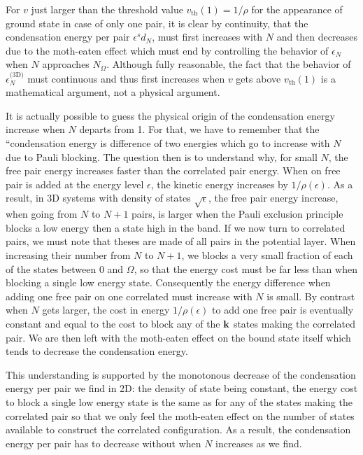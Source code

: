 \documentclass{article}
\newcommand{\sd}{{\ensuremath{{\text{(3D)}}}}}
\begin{document}
\subsubsection{}
For $v$ just larger than the threshold value $v_{\text{th}}(1)=1/\rho$ for the appearance of ground state in case of only one pair, it is clear by continuity, that the condensation energy per pair $\epsilon^sd_N$, must first increases with $N$ and then decreases due to the moth-eaten effect which must end by controlling the behavior of $\epsilon_N$ when $N$ approaches $N_\Omega$.  Although fully reasonable, the fact that the behavior of $\epsilon^\sd_N$ must continuous and thus first increases when $v$ gets above $v_{\text{th}}(1)$ is a mathematical argument, not a physical argument. 

It is actually possible to guess the physical origin of the condensation energy increase when $N$ departs from 1.  For that, we have to remember that the ``condensation energy is difference of two energies which go to increase with $N$ due to Pauli blocking.  The question then is to understand why, for small $N$, the free pair energy increases faster than the correlated pair energy.  When on free pair is added at the energy level $\epsilon$, the kinetic energy increases by $1/\rho(\epsilon)$.  As a result, in 3D systems with density of states $\sqrt{\epsilon}$, the free pair energy increase, when going from $N$ to $N+1$ pairs, is larger when the Pauli exclusion principle blocks a low energy then a state high in the band.  If we now turn to correlated pairs, we must note that theses are made of all pairs in the potential layer. When increasing their number from $N$ to $N+1$, we blocks a very small fraction of each of the states between $0$ and $\Omega$, so that the energy cost must be far less than when blocking a single low energy state.  Consequently the energy difference when adding one free pair on one correlated must increase with $N$ is small. By contrast when $N$ gets larger, the cost in energy $1/\rho(\epsilon)$ to add one free pair is eventually constant and equal to the cost to block any of the $\mathbf{k}$ states making the correlated pair.  We are then left with the moth-eaten effect on the bound state itself which tends to decrease the condensation energy. 

This understanding is supported by the monotonous decrease of the condensation energy per pair we find in 2D: the density of state being constant, the energy cost to block a single low energy state is the same as for any of the states making the correlated pair so that we only feel the moth-eaten effect on the number of states available to construct the correlated configuration.  As a result, the condensation energy per pair has to decrease without when $N$ increases as we find.  
\end{document}
